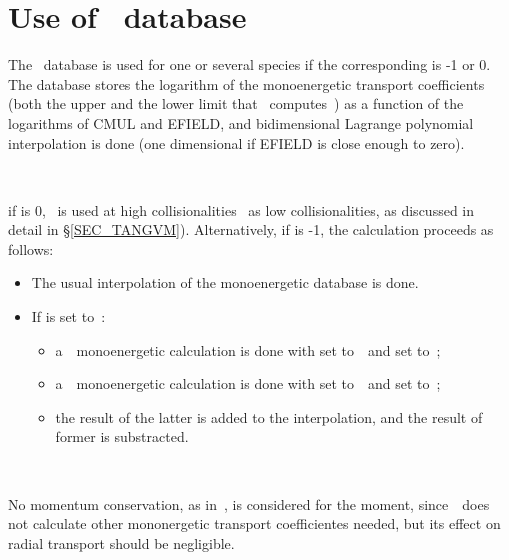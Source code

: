 
\section{Use of \DKES~database}\label{SEC_UDKES}

The \DKES~database is used for one or several species if the corresponding  is -1 or 0. The database stores the logarithm of the monoenergetic transport coefficients (both the upper and the lower limit that \DKES~computes~\citep{hirshman1986dkes}) as a function of the logarithms of {\ttfamily CMUL} and {\ttfamily EFIELD}, and bidimensional Lagrange polynomial interpolation is done (one dimensional if  {\ttfamily EFIELD} is close enough to zero). %

\

 if  is 0, \DKES~is used at high collisionalities \KNOSOS~as low collisionalities, as discussed in detail in \S\ref{SEC_TANGVM}). Alternatively, if  is -1, the calculation proceeds as follows:
\begin{itemize}
\item The usual interpolation of the monoenergetic database is done.
\item If  is set to~\true:
\begin{itemize}
\item a~\KNOSOS~monoenergetic calculation is done with  set to~\true~and  set to~\false;
\item a~\KNOSOS~monoenergetic calculation is done with  set to~\false~and  set to~\true;
\item the result of the latter is added to the interpolation, and the result of former is substracted.
\end{itemize}
\end{itemize}

\

No momentum conservation, as in~\cite{maassberg2009momentum}, is considered for the moment, since~\KNOSOS~does not calculate other mononergetic transport coefficientes needed, but its effect on radial transport should be negligible.



